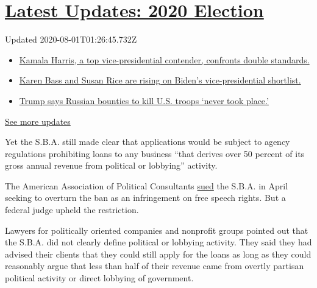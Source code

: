 \hypertarget{latest-updates-2020-election}{%
\section{\texorpdfstring{\href{https://www.nytimes.com/2020/07/31/us/elections/biden-vs-trump.html?action=click\&pgtype=Article\&state=default\&region=MAIN_CONTENT_1\&context=storylines_live_updates}{Latest
Updates: 2020
Election}}{Latest Updates: 2020 Election}}\label{latest-updates-2020-election}}

Updated 2020-08-01T01:26:45.732Z

\begin{itemize}
\tightlist
\item
  \href{https://www.nytimes.com/2020/07/31/us/elections/biden-vs-trump.html?action=click\&pgtype=Article\&state=default\&region=MAIN_CONTENT_1\&context=storylines_live_updates\#link-29fdff45}{Kamala
  Harris, a top vice-presidential contender, confronts double
  standards.}
\item
  \href{https://www.nytimes.com/2020/07/31/us/elections/biden-vs-trump.html?action=click\&pgtype=Article\&state=default\&region=MAIN_CONTENT_1\&context=storylines_live_updates\#link-13ec3d9c}{Karen
  Bass and Susan Rice are rising on Biden's vice-presidential
  shortlist.}
\item
  \href{https://www.nytimes.com/2020/07/31/us/elections/biden-vs-trump.html?action=click\&pgtype=Article\&state=default\&region=MAIN_CONTENT_1\&context=storylines_live_updates\#link-49e9a016}{Trump
  says Russian bounties to kill U.S. troops `never took place.'}
\end{itemize}

\href{https://www.nytimes.com/2020/07/31/us/elections/biden-vs-trump.html?action=click\&pgtype=Article\&state=default\&region=MAIN_CONTENT_1\&context=storylines_live_updates}{See
more updates}

Yet the S.B.A. still made clear that applications would be subject to
agency regulations prohibiting loans to any business ``that derives over
50 percent of its gross annual revenue from political or lobbying''
activity.

The American Association of Political Consultants
\href{https://www.documentcloud.org/documents/6876481-The-S-B-A-Won-t-Issue-Loans-to-Political.html}{sued}
the S.B.A. in April seeking to overturn the ban as an infringement on
free speech rights. But a federal judge upheld the restriction.

Lawyers for politically oriented companies and nonprofit groups pointed
out that the S.B.A. did not clearly define political or lobbying
activity. They said they had advised their clients that they could still
apply for the loans as long as they could reasonably argue that less
than half of their revenue came from overtly partisan political activity
or direct lobbying of government.

